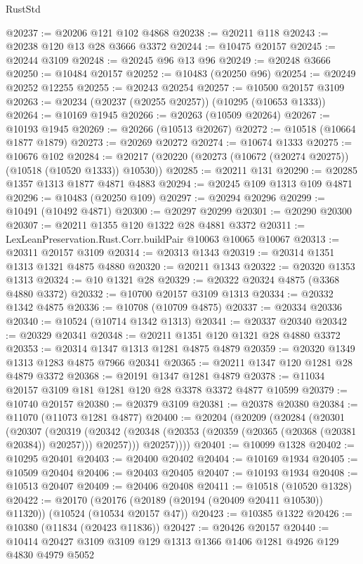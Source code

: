 \begin{lexlean}{RustStd}
\begin{coremodule}
@20237 := @20206 @121 @102 @4868
@20238 := @20211 @118
@20243 := @20238 @120 @13 @28 @3666 @3372
@20244 := @10475 @20157
@20245 := @20244 @3109
@20248 := @20245 @96 @13 @96
@20249 := @20248 @3666
@20250 := @10484 @20157
@20252 := @10483 (@20250 @96)
@20254 := @20249 @20252 @12255
@20255 := @20243 @20254
@20257 := @10500 @20157 @3109
@20263 := @20234 (@20237 (@20255 @20257)) (@10295 (@10653 @1333))
@20264 := @10169 @1945
@20266 := @20263 (@10509 @20264)
@20267 := @10193 @1945
@20269 := @20266 (@10513 @20267)
@20272 := @10518 (@10664 @1877 @1879)
@20273 := @20269 @20272
@20274 := @10674 @1333
@20275 := @10676 @102
@20284 := @20217 (@20220 (@20273 (@10672 (@20274 @20275)) (@10518 (@10520 @1333)) @10530))
@20285 := @20211 @131
@20290 := @20285 @1357 @1313 @1877 @4871 @4883
@20294 := @20245 @109 @1313 @109 @4871
@20296 := @10483 (@20250 @109)
@20297 := @20294 @20296
@20299 := @10491 (@10492 @4871)
@20300 := @20297 @20299
@20301 := @20290 @20300
@20307 := @20211 @1355 @120 @1322 @28 @4881 @3372
@20311 := LexLeanPreservation.Rust.Corr.buildPair @10063 @10065 @10067
@20313 := @20311 @20157 @3109
@20314 := @20313 @1343
@20319 := @20314 @1351 @1313 @1321 @4875 @4880
@20320 := @20211 @1343
@20322 := @20320 @1353 @1313
@20324 := @10 @1321 @28
@20329 := @20322 @20324 @4875 (@3368 @4880 @3372)
@20332 := @10700 @20157 @3109 @1313
@20334 := @20332 @1342 @4875
@20336 := @10708 (@10709 @4875)
@20337 := @20334 @20336
@20340 := @10524 (@10714 @1342 @1313)
@20341 := @20337 @20340
@20342 := @20329 @20341
@20348 := @20211 @1351 @120 @1321 @28 @4880 @3372
@20353 := @20314 @1347 @1313 @1281 @4875 @4879
@20359 := @20320 @1349 @1313 @1283 @4875 @7966 @20341
@20365 := @20211 @1347 @120 @1281 @28 @4879 @3372
@20368 := @20191 @1347 @1281 @4879
@20378 := @11034 @20157 @3109 @181 @1281 @120 @28 @3378 @3372 @4877 @10599
@20379 := @10740 @20157
@20380 := @20379 @3109
@20381 := @20378 @20380
@20384 := @11070 (@11073 @1281 @4877)
@20400 := @20204
    (@20209
      (@20284
        (@20301
          (@20307
            (@20319
              (@20342 (@20348 (@20353 (@20359 (@20365 (@20368 (@20381 @20384)) @20257))) @20257)))
            @20257))))
@20401 := @10099 @1328
@20402 := @10295 @20401
@20403 := @20400 @20402
@20404 := @10169 @1934
@20405 := @10509 @20404
@20406 := @20403 @20405
@20407 := @10193 @1934
@20408 := @10513 @20407
@20409 := @20406 @20408
@20411 := @10518 (@10520 @1328)
@20422 := @20170
    (@20176 (@20189 (@20194 (@20409 @20411 @10530)) @11320))
    (@10524 (@10534 @20157 @47))
@20423 := @10385 @1322
@20426 := @10380 (@11834 (@20423 @11836))
@20427 := @20426 @20157
@20440 := @10414 @20427 @3109 @3109 @129 @1313 @1366 @1406 @1281 @4926 @129 @4830 @4979 @5052

\end{coremodule}
\end{lexlean}
